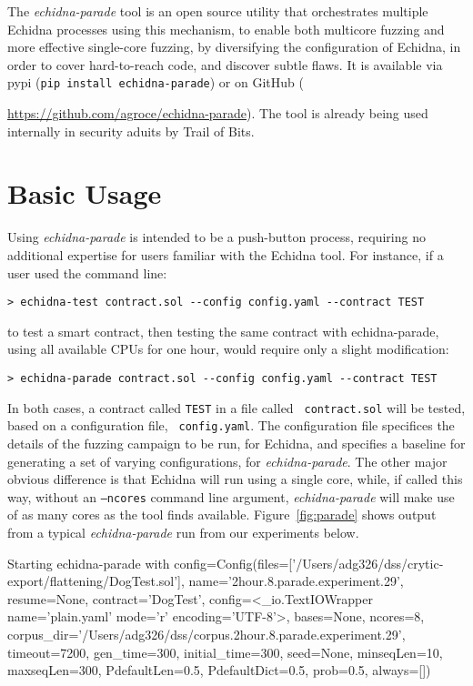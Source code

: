\documentclass[sigconf]{acmart}
\begin{document}
The \emph{echidna-parade} tool is an open source utility that orchestrates multiple
Echidna processes using this mechanism, to enable both multicore
fuzzing and more effective single-core fuzzing, by diversifying the
configuration of Echidna, in order to cover hard-to-reach code, and
discover subtle flaws. It is available via pypi ({\tt pip
    install echidna-parade}) or on GitHub
({\url{https://github.com/agroce/echidna-parade}).  The tool is already being used internally in security aduits by Trail of Bits.

\section{Basic Usage}

Using \emph{echidna-parade} is intended to be a push-button process,
requiring no additional expertise for users familiar with the Echidna
tool.  For instance, if a user used the command line:

{\scriptsize
\begin{verbatim}
> echidna-test contract.sol --config config.yaml --contract TEST
\end{verbatim}
  }

\noindent to test a smart contract, then testing the same contract with echidna-parade, using all
available CPUs for one hour, would require only a slight modification:

{\scriptsize
\begin{verbatim}
> echidna-parade contract.sol --config config.yaml --contract TEST
\end{verbatim}
  }

In both cases, a contract called {\tt TEST} in a file called {\tt
  contract.sol} will be tested, based on a configuration file, {\tt
  config.yaml}.  The configuration file specifices the details of the
fuzzing campaign to be run, for Echidna, and specifies a baseline for
generating a set of varying configurations, for
\emph{echidna-parade}.  The other major obvious difference is that Echidna
will run using a single core, while, if called this way, without an
{\tt --ncores} command line argument,
\emph{echidna-parade} will make use of as many cores as the tool
finds available.  Figure~\ref{fig:parade} shows output from a typical
\emph{echidna-parade} run from our experiments below.

\begin{figure*}
  {\scriptsize
    \begin{code}
Starting echidna-parade with
config=Config(files=['/Users/adg326/dss/crytic-export/flattening/DogTest.sol'],
  name='2hour.8.parade.experiment.29', resume=None, contract='DogTest',
  config=<\_io.TextIOWrapper name='plain.yaml' mode='r' encoding='UTF-8'>, bases=None, ncores=8,
  corpus\_dir='/Users/adg326/dss/corpus.2hour.8.parade.experiment.29', timeout=7200,
  gen\_time=300, initial\_time=300, seed=None, minseqLen=10,
  maxseqLen=300, PdefaultLen=0.5, PdefaultDict=0.5,
  prob=0.5, always=[])


\end{code}}
\end{figure*}}
\end{document}
